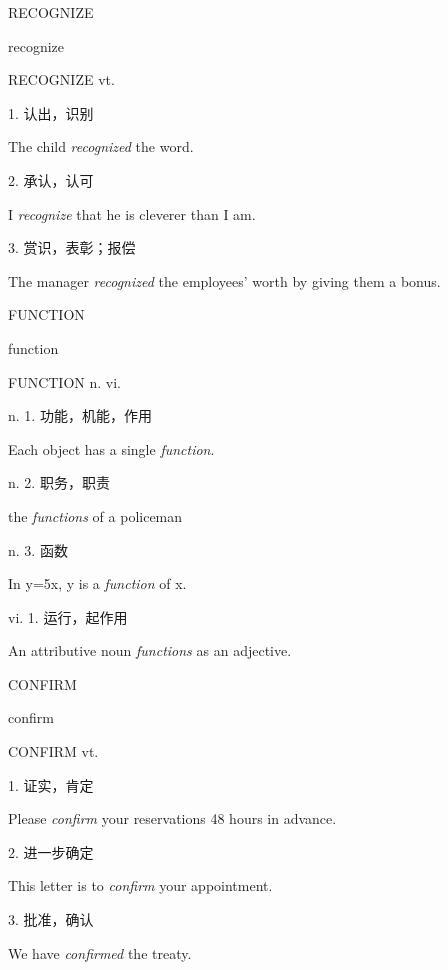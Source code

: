 \begin{flashcard}{
RECOGNIZE

recognize
}
\begin{center}
RECOGNIZE vt. 
\end{center}
1. 认出，识别

The child \textit{recognized} the word.

2. 承认，认可

I \textit{recognize} that he is cleverer than I am.

3. 赏识，表彰；报偿

The manager \textit{recognized} the employees' worth by giving them a bonus.

\end{flashcard}
\begin{flashcard}{
FUNCTION

function
}
\begin{center}
FUNCTION n. vi. 
\end{center}
n. 1. 功能，机能，作用

Each object has a single \textit{function}.

n. 2. 职务，职责

the \textit{functions} of a policeman

n. 3. 函数

In y=5x, y is a \textit{function} of x.

vi. 1. 运行，起作用

An attributive noun \textit{functions} as an adjective.

\end{flashcard}
\begin{flashcard}{
CONFIRM

confirm
}
\begin{center}
CONFIRM vt. 
\end{center}
1. 证实，肯定

Please \textit{confirm} your reservations 48 hours in advance.

2. 进一步确定

This letter is to \textit{confirm} your appointment.

3. 批准，确认

We have \textit{confirmed} the treaty.

\end{flashcard}

